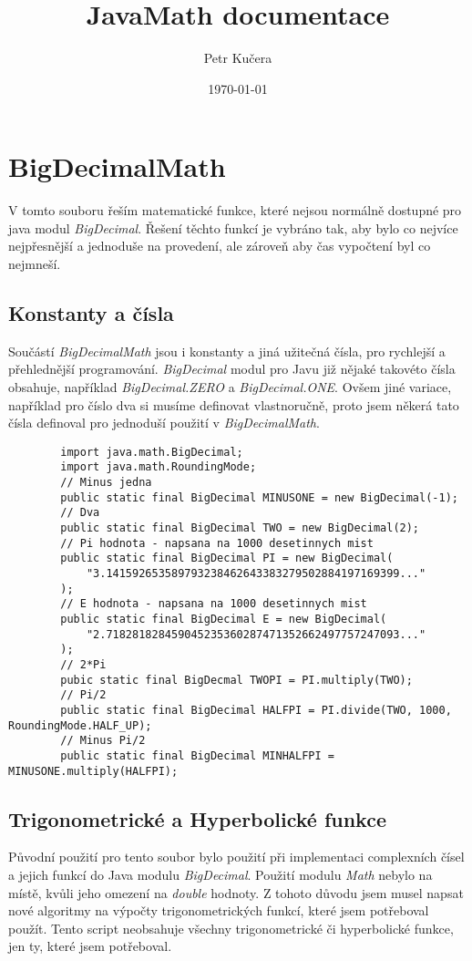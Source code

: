 \documentclass{article}
\title{\textbf{JavaMath documentace}}
\author{Petr Kučera}
\date{\today}
\begin{document}
    \setcounter{section}{1}
    \section{BigDecimalMath} 
    V tomto souboru řeším matematické funkce, které nejsou normálně dostupné pro
    java modul \textit{BigDecimal}. Řešení těchto funkcí je vybráno tak, aby bylo co
    nejvíce nejpřesnější a jednoduše na provedení, ale zároveň aby čas vypočtení byl co
    nejmneší.

    \subsection{Konstanty a čísla}
    Součástí \textit{BigDecimalMath} jsou i konstanty a jiná užitečná čísla, pro rychlejší
    a přehlednější programování. 
    \textit{BigDecimal} modul pro Javu již nějaké takovéto čísla obsahuje, 
    například \textit{BigDecimal.ZERO} a \textit{BigDecimal.ONE}. Ovšem jiné variace, například
    pro číslo dva si musíme definovat vlastnoručně, proto jsem někerá tato čísla definoval pro
    jednoduší použití v \textit{BigDecimalMath}. 
    \begin{lstlisting}
        import java.math.BigDecimal;
        import java.math.RoundingMode;
        // Minus jedna
        public static final BigDecimal MINUSONE = new BigDecimal(-1);
        // Dva
        public static final BigDecimal TWO = new BigDecimal(2);
        // Pi hodnota - napsana na 1000 desetinnych mist
        public static final BigDecimal PI = new BigDecimal(
            "3.141592653589793238462643383279502884197169399..."
        );
        // E hodnota - napsana na 1000 desetinnych mist
        public static final BigDecimal E = new BigDecimal(
            "2.718281828459045235360287471352662497757247093..."
        );
        // 2*Pi
        pubic static final BigDecmal TWOPI = PI.multiply(TWO);
        // Pi/2
        public static final BigDecimal HALFPI = PI.divide(TWO, 1000, RoundingMode.HALF_UP);
        // Minus Pi/2
        public static final BigDecimal MINHALFPI = MINUSONE.multiply(HALFPI);
    \end{lstlisting}
    \subsection{Trigonometrické a Hyperbolické funkce}
    Původní použití pro tento soubor bylo použití při implementaci complexních čísel a 
    jejich funkcí do Java modulu \textit{BigDecimal}. Použití modulu \textit{Math} nebylo
    na místě, kvůli jeho omezení na \textit{double} hodnoty. Z tohoto důvodu jsem musel napsat
    nové algoritmy na výpočty trigonometrických funkcí, které jsem potřeboval použít. \newline
    Tento script neobsahuje všechny trigonometrické či hyperbolické funkce, jen ty, které jsem potřeboval.
\end{document}
